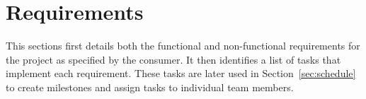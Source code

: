 \section{Requirements}
\label{sec:requirements}

This sections first details both the functional and non-functional
requirements for the project as specified by the consumer. It then
identifies a list of tasks that implement each requirement. These tasks
are later used in Section~\ref{sec:schedule} to create milestones and
assign tasks to individual team members.




